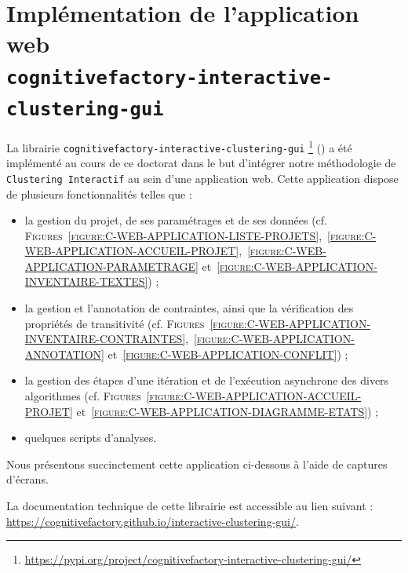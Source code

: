 \section[
		\texttt{cognitivefactory-interactive-clustering-gui}
	]{
		Implémentation de l'application web \\ \texttt{cognitivefactory-interactive-clustering-gui}
	}
\label{annex:C.2-DESCRIPTION-IMPLEMENTATION-INTERACTIVE-CLUSTERING-GUI}

	La librairie \texttt{cognitivefactory-interactive-clustering-gui} \footnote{
		\url{https://pypi.org/project/cognitivefactory-interactive-clustering-gui/}
	} (\cite{schild-etal:2022:cognitivefactory-interactiveclusteringgui}) a été implémenté au cours de ce doctorat dans le but d'intégrer notre méthodologie de \texttt{Clustering Interactif} au sein d'une application web.
	Cette application dispose de plusieurs fonctionnalités telles que :
	\begin{itemize}
		\item la gestion du projet, de ses paramétrages et de ses données (cf. \textsc{Figures}~\textsc{\ref{figure:C-WEB-APPLICATION-LISTE-PROJETS}},~\textsc{\ref{figure:C-WEB-APPLICATION-ACCUEIL-PROJET}},~\textsc{\ref{figure:C-WEB-APPLICATION-PARAMETRAGE}} et~\textsc{\ref{figure:C-WEB-APPLICATION-INVENTAIRE-TEXTES}}) ;
		\item la gestion et l'annotation de contraintes, ainsi que la vérification des propriétés de transitivité (cf. \textsc{Figures}~\textsc{\ref{figure:C-WEB-APPLICATION-INVENTAIRE-CONTRAINTES}},~\textsc{\ref{figure:C-WEB-APPLICATION-ANNOTATION}} et~\textsc{\ref{figure:C-WEB-APPLICATION-CONFLIT}}) ;
		\item la gestion des étapes d'une itération et de l'exécution asynchrone des divers algorithmes (cf. \textsc{Figures}~\textsc{\ref{figure:C-WEB-APPLICATION-ACCUEIL-PROJET}} et~\textsc{\ref{figure:C-WEB-APPLICATION-DIAGRAMME-ETATS}}) ;
		\item quelques scripts d'analyses.
	\end{itemize}
	
	Nous présentons succinctement cette application ci-dessous à l'aide de captures d'écrans.

	
	\begin{leftBarInformation}
		La documentation technique de cette librairie est accessible au lien suivant : \url{https://cognitivefactory.github.io/interactive-clustering-gui/}.
	\end{leftBarInformation}
	
